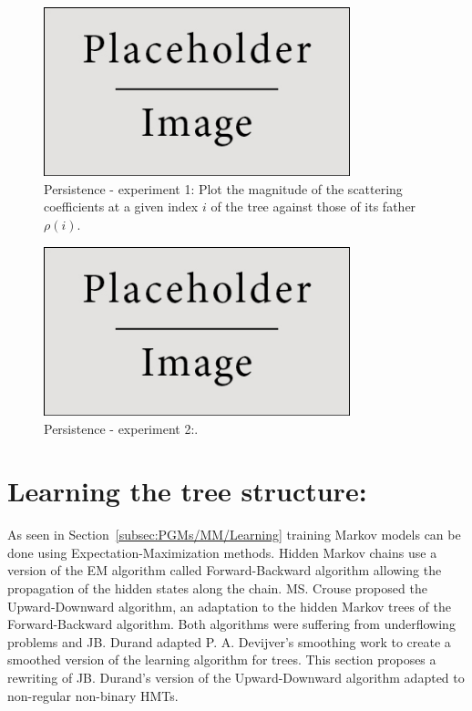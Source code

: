 \documentclass[a4paper,11pt]{report}
\begin{document}
		\begin{figure}
				\begin{center}
					\includegraphics[width=3.5in]{placeholder.jpg}
					\caption[Persistence - experiment 1.]{Persistence - experiment 1: Plot the magnitude of the scattering coefficients at a given index $i$ of the tree against those of its father $\rho(i)$.} %
					\label{fig:Persistence - 1}
				\end{center}
		\end{figure} 
		
		\begin{figure}
				\begin{center}
					\includegraphics[width=3.5in]{placeholder.jpg}
					\caption[Persistence - experiment 2.]{Persistence - experiment 2:.} %
					\label{fig:Persistence - 2}
				\end{center}
		\end{figure}
		
		
  \section{Learning the tree structure:}
    \label{sec:SHMT/Learning}
    
    As seen in Section~\ref{subsec:PGMs/MM/Learning} training Markov  models can be done using Expectation-Maximization methods. Hidden Markov chains use a version of the EM algorithm called Forward-Backward algorithm allowing the propagation of the hidden states along the chain. MS. Crouse \cite{crouse1998wavelet} proposed the Upward-Downward algorithm, an adaptation to the hidden Markov trees of the Forward-Backward algorithm. Both algorithms were suffering from underflowing problems \cite{ephraim2002hidden} and JB. Durand \cite{durand2004computational} adapted P. A. Devijver's smoothing \cite{devijver1985baum} work to create a smoothed version of the learning algorithm for trees. This section proposes a rewriting of JB. Durand's version of the Upward-Downward algorithm adapted to non-regular non-binary HMTs.\\
       
\end{document}
